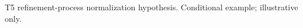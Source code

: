 \begin{example}
\par
\Deps T5 refinement-process normalization hypothesis.
\Status Conditional example; illustrative only.

\end{example}
